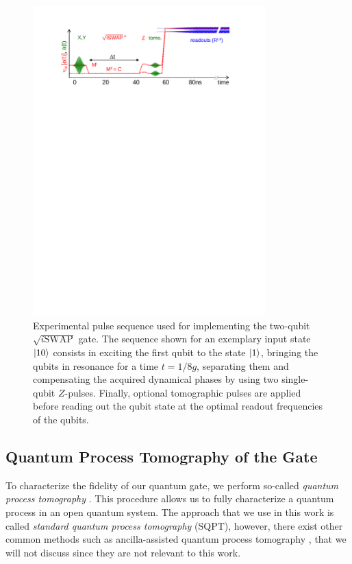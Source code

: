 \begin{figure}[ht!]
	\centering
		\includegraphics[width=0.8\textwidth]{./material/papers/iswap/figures/iswap_gate_pulse_sequence}
	\caption{Experimental pulse sequence used for implementing the two-qubit $\sqrt{i\mathrm{SWAP}}$ gate. The sequence shown for an exemplary input state $\left| 10 \right>$ consists in exciting the first qubit to the state $\left| 1 \right>$, bringing the qubits in resonance for a time $t=1/8g$, separating them and compensating the acquired dynamical phases by using two single-qubit $Z$-pulses. Finally, optional tomographic pulses are applied before reading out the qubit state at the optimal readout frequencies of the qubits.}
	\label{fig:iswap_pulse_sequence}
\end{figure}


\subsection{Quantum Process Tomography of the Gate}

To characterize the fidelity of our quantum gate, we perform so-called {\it quantum process tomography} \citep{poyatos_complete_1997}. This procedure allows us to fully characterize a quantum process in an open quantum system. The approach that we use in this work is called {\it standard quantum process tomography} (SQPT), however, there exist other common methods such as ancilla-assisted quantum process tomography \citep{dur_nonlocal_2001,dariano_quantum_2001,altepeter_ancilla-assisted_2003}, that we will not discuss since they are not relevant to this work.

